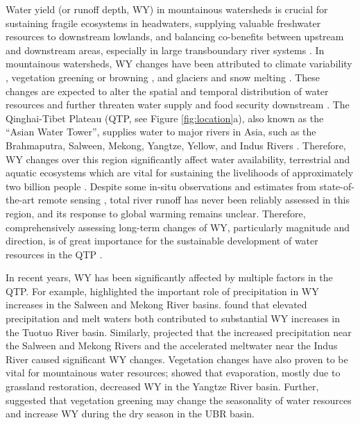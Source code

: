 \documentclass[hess, manuscript]{copernicus}
\begin{document}
\introduction
Water yield (or runoff depth, WY) in mountainous watersheds is crucial for sustaining fragile ecosystems in headwaters, supplying valuable freshwater resources to downstream lowlands, and balancing co-benefits between upstream and downstream areas, especially in large transboundary river systems \citep{viviroli2011climate}. In mountainous watersheds, WY changes have been attributed to climate variability \citep{dierauer2018climate,song2021river}, vegetation greening or browning \citep{goulden2014mountain,zhou2021divergent}, and glaciers and snow melting \citep{huss2018global, biemans2019importance}. These changes are expected to alter the spatial and temporal distribution of water resources \citep{tang2019streamflow} and further threaten water supply and food security downstream \citep{biemans2019importance}. The Qinghai-Tibet Plateau (QTP, see Figure \ref{fig:location}a), also known as the “Asian Water Tower”, supplies water to major rivers in Asia, such as the Brahmaputra, Salween, Mekong, Yangtze, Yellow, and Indus Rivers \citep{kang2010review,yao2010glacial,yao2019recent}. Therefore, WY changes over this region significantly affect water availability, terrestrial and aquatic ecosystems which are vital for sustaining the livelihoods of approximately two billion people \citep{immerzeel2010climate}. Despite some in-situ observations and estimates from state-of-the-art remote sensing \citep{wang2021tp}, total river runoff has never been reliably assessed in this region, and its response to global warming remains unclear. Therefore, comprehensively assessing long-term changes of WY, particularly magnitude and direction, is of great importance for the sustainable development of water resources in the  QTP \citep{yao2019recent}. 

In recent years, WY has been significantly affected by multiple factors in the QTP. For example, \citet{fan2015temperature} highlighted the important role of precipitation in WY increases in the Salween and Mekong River basins. \citet{li2020substantial} found that elevated precipitation and melt waters both contributed to substantial WY increases in the Tuotuo River basin. Similarly, \citet{lutz2014consistent} projected that the increased precipitation near the Salween and Mekong Rivers and the accelerated meltwater near the Indus River caused significant WY changes. Vegetation changes have also proven to be vital for mountainous water resources; \citet{li2017grassland} showed that evaporation, mostly due to grassland restoration, decreased WY in the Yangtze River basin. Further, \citet{li2021vegetation} suggested that vegetation greening may change the seasonality of water resources and increase WY during the dry season in the UBR basin.
\end{document}
